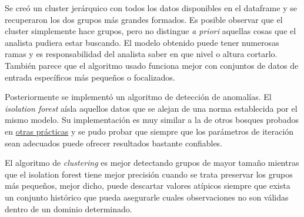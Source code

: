 \documentclass[12pt,a4paper,table]{article}
\begin{document}
Se creó un cluster jerárquico con todos los datos disponibles en el
dataframe y se recuperaron los dos grupos más grandes formados. Es
posible observar que el cluster simplemente hace grupos, pero no
distingue \emph{a priori} aquellas cosas que el analista pudiera estar
buscando. El modelo obtenido puede tener numerosas ramas y es
responsabilidad del analista saber en que nivel o altura cortarlo.
También parece que el algoritmo usado funciona mejor con conjuntos de
datos de entrada específicos más pequeños o focalizados.

Posteriormente se implementó un algoritmo de detección de anomalías. El
\emph{isolation forest} aísla aquellos datos que se alejan de una norma
establecida por el mismo modelo. Su implementación es muy similar a la
de otros bosques probados en
\href{https://gitlab.com/genomorro/unir/-/blob/AA-A1}{otras prácticas} y
se pudo probar que siempre que los parámetros de iteración sean
adecuados puede ofrecer resultados bastante confiables.

El algoritmo de \emph{clustering} es mejor detectando grupos de mayor
tamaño mientras que el isolation forest tiene mejor precisión cuando se
trata preservar los grupos más pequeños, mejor dicho, puede descartar
valores atípicos siempre que exista un conjunto histórico que pueda
asegurarle cuales observaciones no son válidas dentro de un dominio
determinado.


    
        
    
    
\end{document}
